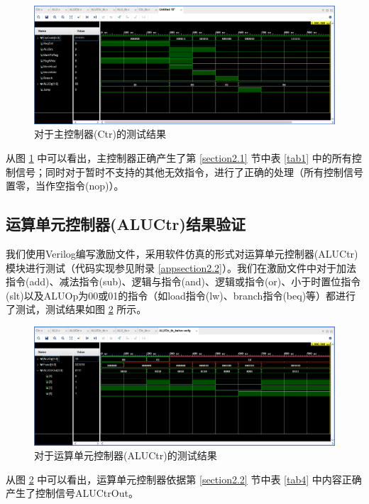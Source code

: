 \documentclass{cumcm}
\numberwithin{equation}{section}
\numberwithin{equation}{subsection}
\begin{document}
\begin{figure}[htbp]
    \centering
    \includegraphics[width=6.3in]{1.png}
    \caption{对于主控制器(Ctr)的测试结果}
    \label{fig1}
\end{figure}

从图 \ref{fig1} 中可以看出，主控制器正确产生了第 \ref{section2.1} 节中表 \ref{tab1} 中的所有控制信号；同时对于暂时不支持的其他无效指令，进行了正确的处理（所有控制信号置零，当作空指令(nop)）。

\subsection{运算单元控制器(ALUCtr)结果验证}\label{section4.2}

我们使用Verilog编写激励文件，采用软件仿真的形式对运算单元控制器(ALUCtr)模块进行测试（代码实现参见附录 \ref{appsection2.2}）。我们在激励文件中对于加法指令(add)、减法指令(sub)、逻辑与指令(and)、逻辑或指令(or)、小于时置位指令(slt)以及ALUOp为00或01的指令（如load指令(lw)、branch指令(beq)等）都进行了测试，测试结果如图 \ref{fig2} 所示。

\begin{figure}[htbp]
    \centering
    \includegraphics[width=6.3in]{2.png}
    \caption{对于运算单元控制器(ALUCtr)的测试结果}
    \label{fig2}
\end{figure}

从图 \ref{fig2} 中可以看出，运算单元控制器依据第 \ref{section2.2} 节中表 \ref{tab4} 中内容正确产生了控制信号ALUCtrOut。
\end{document}
